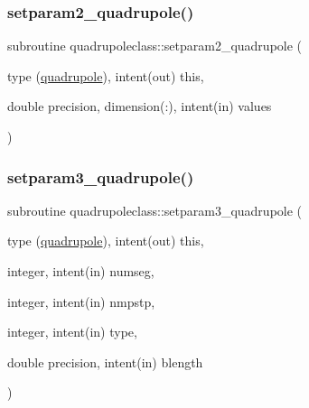 \subsubsection{\texorpdfstring{setparam2\_quadrupole()}{setparam2\_quadrupole()}}
{\footnotesize\ttfamily subroutine quadrupoleclass\+::setparam2\+\_\+quadrupole (\begin{DoxyParamCaption}\item[{type (\mbox{\hyperlink{namespacequadrupoleclass_structquadrupoleclass_1_1quadrupole}{quadrupole}}), intent(out)}]{this,  }\item[{double precision, dimension(\+:), intent(in)}]{values }\end{DoxyParamCaption})}

\mbox{\label{namespacequadrupoleclass_a6e3465265973203b8452b1b2463a2e4b}} 
\subsubsection{\texorpdfstring{setparam3\_quadrupole()}{setparam3\_quadrupole()}}
{\footnotesize\ttfamily subroutine quadrupoleclass\+::setparam3\+\_\+quadrupole (\begin{DoxyParamCaption}\item[{type (\mbox{\hyperlink{namespacequadrupoleclass_structquadrupoleclass_1_1quadrupole}{quadrupole}}), intent(out)}]{this,  }\item[{integer, intent(in)}]{numseg,  }\item[{integer, intent(in)}]{nmpstp,  }\item[{integer, intent(in)}]{type,  }\item[{double precision, intent(in)}]{blength }\end{DoxyParamCaption})}

\mbox{\label{namespacequadrupoleclass_a0a62a19a637c00cb1d985698e111b415}} 
